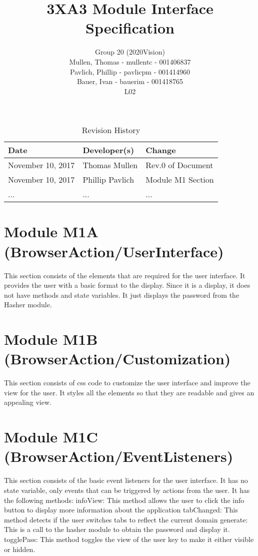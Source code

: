 \documentclass[12pt]{article}
\title{3XA3 Module Interface Specification}
\author{Group 20 (2020Vision)\\
Mullen, Thomas - mullentc - 001406837\\
Pavlich, Phillip - pavlicpm - 001414960\\
Bauer, Ivan - bauerim - 001418765\\
L02}
\date{}
\begin{document}
\begin{table}[hp]
\caption{Revision History} \label{TblRevisionHistory}
\begin{tabularx}{\textwidth}{XXl}
\toprule
\textbf{Date} & \textbf{Developer(s)} & \textbf{Change}\\
\midrule
November 10, 2017 & Thomas Mullen & Rev.0 of Document\\
November 10, 2017 & Phillip Pavlich & Module M1 Section\\
... & ... & ...\\
\bottomrule
\end{tabularx}
\end{table}
\newpage

\maketitle
\newpage

\section{Module M1A (BrowserAction/UserInterface)}
This section consists of the elements that are required for the user interface. It provides the user with a basic format to the display. Since it is a display, it does not have methods and state variables. It just displays the password from the Hasher module. 
\section{Module M1B (BrowserAction/Customization)}
This section consists of css code to customize the user interface and improve the view for the user. It styles all the elements so that they are readable and gives an appealing view.
\section{Module M1C (BrowserAction/EventListeners)}
This section consists of the basic event listeners for the user interface. It has no state variable, only events that can be triggered by actions from the user. It has the following methods:
\newline
\newline
infoView: This method allows the user to click the info button to display more information about the application
\newline
tabChanged: This method detects if the user switches tabs to reflect the current domain
\newline
generate: This is a call to the hasher module to obtain the password and display it.
\newline
togglePass: This method toggles the view of the user key to make it either visible or hidden.
\end{document}
